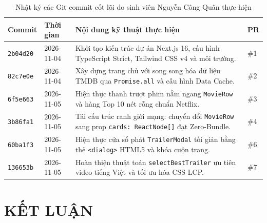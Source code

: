 \documentclass[12pt,a4paper]{extarticle}
\begin{document}
\begin{table}[H]
\centering
\caption{Nhật ký các Git commit cốt lõi do sinh viên Nguyễn Công Quân thực hiện}
\label{tab:git-matrix}
\fontsize{9.5}{12.5}\selectfont
\renewcommand{\arraystretch}{1.2}
\begin{tabularx}{\textwidth}{|p{1.8cm}|p{2.2cm}|X|p{1.2cm}|}
\hline
\textbf{Commit} & \textbf{Thời gian} & \textbf{Nội dung kỹ thuật thực hiện} & \textbf{PR} \\
\hline
\texttt{2b04d20} & 2026-11-04 & Khởi tạo kiến trúc dự án Next.js 16, cấu hình TypeScript Strict, Tailwind CSS v4 và môi trường. & \#1 \\
\hline
\texttt{82c7e0e} & 2026-11-04 & Xây dựng trang chủ với song song hóa dữ liệu TMDB qua \texttt{Promise.all} và cấu hình Data Cache. & \#2 \\
\hline
\texttt{6f5e663} & 2026-11-05 & Hiện thực thanh trượt phim nằm ngang \texttt{MovieRow} và hàng Top 10 nét rỗng chuẩn Netflix. & \#3 \\
\hline
\texttt{3b86fa1} & 2026-11-05 & Tái cấu trúc ranh giới mạng: chuyển đổi \texttt{MovieRow} sang prop \texttt{cards: ReactNode[]} đạt Zero-Bundle. & \#4 \\
\hline
\texttt{60ba1f3} & 2026-11-05 & Hiện thực cửa sổ phát \texttt{TrailerModal} tối giản bằng thẻ \texttt{<dialog>} HTML5 và khóa cuộn trang. & \#6 \\
\hline
\texttt{136653b} & 2026-11-05 & Hoàn thiện thuật toán \texttt{selectBestTrailer} ưu tiên video tiếng Việt và tối ưu hóa CSS LCP. & \#7 \\
\hline
\end{tabularx}
\end{table}

\section{KẾT LUẬN}
\end{document}
